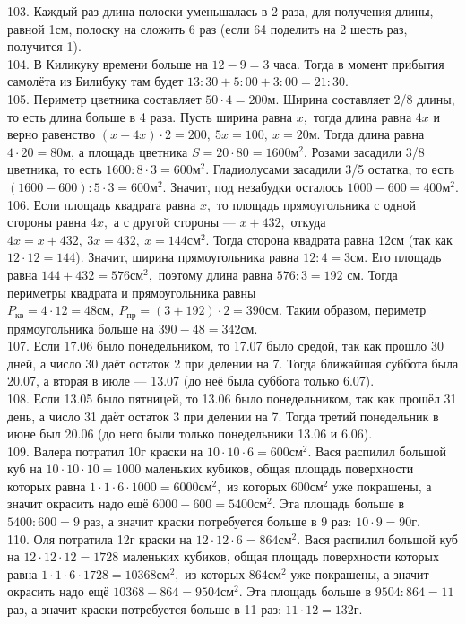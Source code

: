 103. Каждый раз длина полоски уменьшалась в 2 раза, для получения длины, равной 1см, полоску на сложить 6 раз (если 64 поделить на 2 шесть раз, получится 1).\\
104. В Киликуку времени больше на $12-9=3$ часа. Тогда в момент прибытия самолёта из Билибуку там будет $13:30+5:00+3:00=21:30.$\\
105. Периметр цветника составляет $50\cdot4=200$м. Ширина составляет 2/8 длины, то есть длина больше в 4 раза. Пусть ширина равна $x,$ тогда длина равна $4x$ и верно равенство $(x+4x)\cdot2=200,\ 5x=100,\ x=20$м. Тогда длина равна $4\cdot20=80$м, а площадь цветника $S=20\cdot80=1600\text{м}^2.$ Розами засадили 3/8 цветника, то есть $1600:8\cdot3=600\text{м}^2.$ Гладиолусами засадили 3/5 остатка, то есть $(1600-600):5\cdot3=600\text{м}^2.$ Значит, под незабудки осталось $1000-600=400\text{м}^2.$\\
106. Если площадь квадрата равна $x,$ то площадь прямоугольника с одной стороны равна $4x,$ а с другой стороны --- $x+432,$ откуда $4x=x+432,\ 3x=432,\ x=144\text{см}^2.$ Тогда сторона квадрата равна 12см (так как $12\cdot12=144$). Значит, ширина прямоугольника равна $12:4=3$см. Его площадь равна $144+432=576\text{см}^2,$ поэтому длина равна $576:3=192$ см. Тогда периметры квадрата и прямоугольника равны $P_\text{кв}=4\cdot12=48\text{см},\ P_\text{пр}=(3+192)\cdot2=390\text{см}.$ Таким образом, периметр прямоугольника больше на $390-48=342$см.\\
107. Если 17.06 было понедельником, то 17.07 было средой, так как прошло 30 дней, а число 30 даёт остаток 2 при делении на 7. Тогда ближайшая суббота была 20.07, а вторая в июле --- 13.07 (до неё была суббота только 6.07).\\
108. Если 13.05 было пятницей, то 13.06 было понедельником, так как прошёл 31 день, а число 31 даёт остаток 3 при делении на 7. Тогда третий понедельник в июне был 20.06 (до него были только понедельники 13.06 и 6.06).\\
109. Валера потратил 10г краски на $10\cdot10\cdot6=600\text{см}^2.$ Вася распилил большой куб на $10\cdot10\cdot10=1000$ маленьких кубиков, общая площадь поверхности которых равна $1\cdot1\cdot6\cdot1000=6000\text{см}^2,$ из которых $600\text{см}^2$ уже покрашены, а значит окрасить надо ещё $6000-600=5400\text{см}^2.$ Эта площадь больше в $5400:600=9$ раз, а значит краски потребуется больше в 9 раз: $10\cdot9=90$г.\\
110. Оля потратила 12г краски на $12\cdot12\cdot6=864\text{см}^2.$ Вася распилил большой куб на $12\cdot12\cdot12=1728$ маленьких кубиков, общая площадь поверхности которых равна $1\cdot1\cdot6\cdot1728=10368\text{см}^2,$ из которых $864\text{см}^2$ уже покрашены, а значит окрасить надо ещё $10368-864=9504\text{см}^2.$ Эта площадь больше в $9504:864=11$ раз, а значит краски потребуется больше в 11 раз: $11\cdot12=132$г.\\
